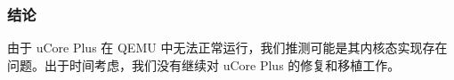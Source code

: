 \subsubsection{结论}

由于 uCore Plus 在 QEMU 中无法正常运行，我们推测可能是其内核态实现存在问题。出于时间考虑，我们没有继续对 uCore Plus 的修复和移植工作。